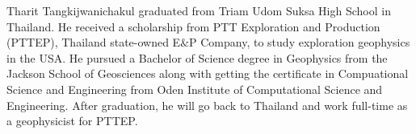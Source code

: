 Tharit Tangkijwanichakul graduated from Triam Udom Suksa High School in Thailand. He received a scholarship from PTT Exploration and Production (PTTEP), Thailand state-owned E$\&$P Company, to study exploration geophysics in the USA. He pursued a Bachelor of Science degree in Geophysics from the Jackson School of Geosciences along with getting the certificate in Compuational Science and Engineering from Oden Institute of Computational Science and Engineering. After graduation, he will go back to Thailand and work full-time as a geophysicist for PTTEP.
